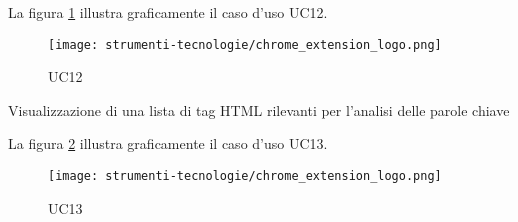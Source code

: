 \vspace{10pt}
\par\noindent
\begin{minipage}{\textwidth}
    La figura \ref{fig:uc12} illustra graficamente il caso d'uso UC12.
    \begin{figure}[H]
        \centering
        \texttt{[image: strumenti-tecnologie/chrome\_extension\_logo.png]} 
        \caption{UC12}
        \label{fig:uc12}
    \end{figure}
\end{minipage}

\begin{usecase}{13}{Visualizzazione di una lista di tag HTML rilevanti per l’analisi delle parole chiave}\label{UC13}
\end{usecase}

\vspace{10pt}
\par\noindent
\begin{minipage}{\textwidth}
    La figura \ref{fig:uc13} illustra graficamente il caso d'uso UC13.
    \begin{figure}[H]
        \centering
        \texttt{[image: strumenti-tecnologie/chrome\_extension\_logo.png]} 
        \caption{UC13}
        \label{fig:uc13}
    \end{figure}
\end{minipage}

